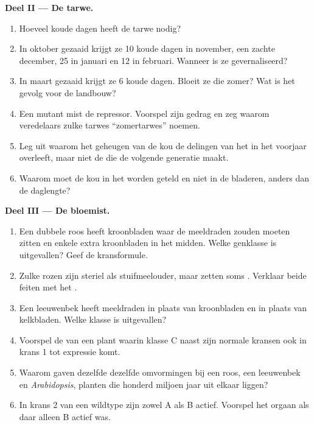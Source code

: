 \begin{problem}
\medskip
\noindent\textbf{Deel II --- De tarwe.}
\begin{enumerate}[resume]
  \item Hoeveel koude dagen heeft de tarwe nodig?
  \item In oktober gezaaid krijgt ze 10 koude dagen in november, een zachte
        december, 25 in januari en 12 in februari. Wanneer is ze
        gevernaliseerd?
  \item In maart gezaaid krijgt ze 6 koude dagen. Bloeit ze die zomer? Wat
        is het gevolg voor de landbouw?
  \item Een mutant mist de repressor. Voorspel zijn gedrag en zeg waarom
        veredelaars zulke tarwes ``zomertarwes'' noemen.
  \item Leg uit waarom het geheugen van de kou de delingen van het 
        in het voorjaar overleeft, maar niet de  die de volgende
        generatie maakt.
  \item Waarom moet de kou in het  worden geteld en niet in de
        bladeren, anders dan de daglengte?
\end{enumerate}

\medskip
\noindent\textbf{Deel III --- De bloemist.}
\begin{enumerate}[resume]
  \item Een dubbele roos heeft kroonbladen waar de meeldraden zouden moeten
        zitten en enkele extra kroonbladen in het midden. Welke genklasse is
        uitgevallen? Geef de kransformule.
  \item Zulke rozen zijn steriel als stuifmeelouder, maar zetten soms .
        Verklaar beide feiten met het .
  \item Een leeuwenbek heeft meeldraden in plaats van kroonbladen en
         in plaats van kelkbladen. Welke klasse is uitgevallen?
  \item Voorspel de  van een plant waarin klasse C naast zijn normale
        kransen ook in krans 1 tot expressie komt.
  \item Waarom gaven dezelfde  dezelfde omvormingen bij een roos,
        een leeuwenbek en \emph{Arabidopsis}, planten die honderd miljoen jaar
        uit elkaar liggen?
  \item In krans 2 van een wildtype  zijn zowel A als B actief.
        Voorspel het orgaan als daar alleen B actief was.
\end{enumerate}


\end{problem}
